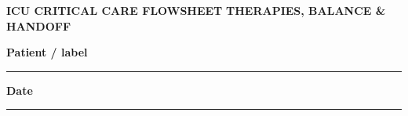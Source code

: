 \documentclass[10pt,letterpaper,landscape]{article}
\newcommand{\field}[2]{\textbf{#1}\enspace\rule{#2}{0.4pt}}
\begin{document}
\newpage

\begin{minipage}[t]{0.67\linewidth}
  {\color{navy}\fontsize{18}{19}\selectfont\bfseries ICU CRITICAL CARE FLOWSHEET}\hspace{8pt}
  {\color{teal}\fontsize{10}{11}\selectfont\bfseries THERAPIES, BALANCE \& HANDOFF}
\end{minipage}%
\begin{minipage}[t]{0.32\linewidth}\raggedleft
  \field{Patient / label}{1.40in}\quad \field{Date}{0.62in}
\end{minipage}
\vspace{3pt}
\end{document}
